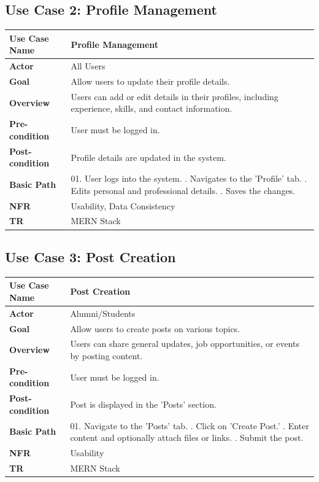 \documentclass[a4paper,12pt]{article}
\begin{document}
\subsection{Use Case 2: Profile Management}
\begin{longtable}{|l|p{12cm}|}
\hline
\textbf{Use Case Name} & Profile Management \\ \hline
\textbf{Actor} & All Users \\ \hline
\textbf{Goal} & Allow users to update their profile details. \\ \hline
\textbf{Overview} & Users can add or edit details in their profiles, including experience, skills, and contact information. \\ \hline
\textbf{Pre-condition} & User must be logged in. \\ \hline
\textbf{Post-condition} & Profile details are updated in the system. \\ \hline
\textbf{Basic Path} & 
01. User logs into the system. \newline
02. Navigates to the 'Profile' tab. \newline
03. Edits personal and professional details. \newline
04. Saves the changes. \\ \hline
\textbf{NFR} & Usability, Data Consistency \\ \hline
\textbf{TR} & MERN Stack \\ \hline
\end{longtable}

\subsection{Use Case 3: Post Creation}
\begin{longtable}{|l|p{12cm}|}
\hline
\textbf{Use Case Name} & Post Creation \\ \hline
\textbf{Actor} & Alumni/Students \\ \hline
\textbf{Goal} & Allow users to create posts on various topics. \\ \hline
\textbf{Overview} & Users can share general updates, job opportunities, or events by posting content. \\ \hline
\textbf{Pre-condition} & User must be logged in. \\ \hline
\textbf{Post-condition} & Post is displayed in the 'Posts' section. \\ \hline
\textbf{Basic Path} & 
01. Navigate to the 'Posts' tab. \newline
02. Click on 'Create Post.' \newline
03. Enter content and optionally attach files or links. \newline
04. Submit the post. \\ \hline
\textbf{NFR} & Usability \\ \hline
\textbf{TR} & MERN Stack \\ \hline
\end{longtable}
\end{document}
